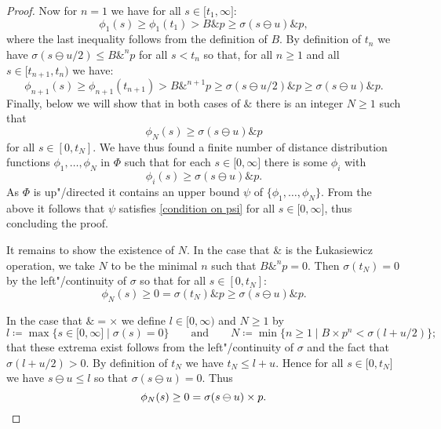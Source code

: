 \documentclass[preprint, a4paper]{elsarticle}
\theoremstyle{definition}
\theoremstyle{remark}
\providecommand{\dfn}{\coloneqq}
\providecommand{\brcs}[1]{\lbrace #1 \rbrace}
\providecommand{\brks}[1]{\lbrack #1 \rbrack}
\providecommand{\set}[1]{\brcs{#1}}
\newcommand{\tn}{\mathbin\&}
\providecommand{\2}{\mathsf 2}
\begin{document}
\begin{proof}
		Now for $n = 1$ we have for all $s \in \brks{t_1, \infty}$:
		\begin{displaymath}
			\phi_1(s) \geq \phi_1(t_1) > B \tn p \geq \sigma(s \ominus u) \tn p,
		\end{displaymath}
		where the last inequality follows from the definition of $B$. By definition of $t_n$ we have $\sigma(s \ominus u/2) \leq B \tn^n p$ for all $s < t_n$ so that, for all $n \geq 1$ and all $s \in [t_{n+1}, t_n)$ we have:
		\begin{displaymath}
			\phi_{n+1} (s) \geq \phi_{n+1}(t_{n+1}) > B \tn^{n+1} p \geq \sigma(s \ominus u/2) \tn p \geq \sigma(s \ominus u) \tn p.
		\end{displaymath}
		Finally, below we will show that in both cases of $\tn$ there is an integer $N \geq 1$ such that
		\begin{displaymath}
			\phi_N(s) \geq \sigma(s \ominus u) \tn p
		\end{displaymath}
		for all $s \in [0, t_N]$. We have thus found a finite number of distance distribution functions $\phi_1, \dotsc, \phi_N$ in $\Phi$ such that for each $s \in \brks{0, \infty}$ there is some $\phi_i$ with
		\begin{displaymath}
			\phi_i(s) \geq \sigma(s \ominus u) \tn p.
		\end{displaymath}
		As $\Phi$ is up"/directed it contains an upper bound $\psi$ of $\set{\phi_1, \dotsc, \phi_N}$. From the above it follows that $\psi$ satisfies \eqref{condition on psi} for all $s \in \brks{0, \infty}$, thus concluding the proof.
		
		It remains to show the existence of $N$. In the case that $\tn$ is the \L ukasiewicz operation, we take $N$ to be the minimal $n$ such that $B \tn^n p = 0$. Then $\sigma(t_N) = 0$ by the left"/continuity of $\sigma$ so that for all $s \in [0, t_N]$:
		\begin{displaymath}
			\phi_N(s) \geq 0 = \sigma(t_N) \tn p \geq \sigma(s \ominus u) \tn p.
		\end{displaymath}
		
		In the case that $\tn = \times$ we define $l \in [0, \infty)$ and $N \geq 1$ by
		\begin{displaymath}
			l \dfn \max\set{s \in \brks{0, \infty} \mid \sigma(s) = 0} \qquad \text{and} \qquad N \dfn \min\set{n \geq 1 \mid B \times p^n < \sigma(l + u/2)};
		\end{displaymath}
		that these extrema exist follows from the left"/continuity of $\sigma$ and the fact that $\sigma(l + u/2) > 0$. By definition of $t_N$ we have $t_N \leq l + u$. Hence for all $s \in \brks{0, t_N}$ we have $s \ominus u \leq l$ so that $\sigma(s \ominus u) = 0$. Thus
		\begin{displaymath}
			\phi_N(s) \geq 0 = \sigma(s \ominus u) \times p. \qedhere
		\end{displaymath}
	\end{proof}
	
\end{document}
